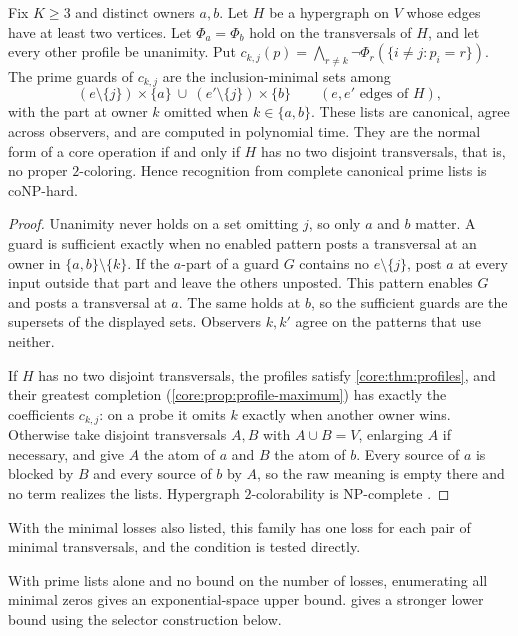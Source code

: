 \begin{proposition}
\label{core:prop:prime-profile-hardness}
Fix $K\ge3$ and distinct owners $a,b$. Let $H$ be a hypergraph on $V$
whose edges have at least two vertices. Let $\Phi_a=\Phi_b$ hold on the
transversals of $H$, and let every other profile be unanimity. Put
$c_{k,j}(p)=\bigwedge_{r\ne k}\neg\Phi_r(\{i\ne j:p_i=r\})$.
The prime guards of $c_{k,j}$ are the inclusion-minimal sets among
\[
 (e\setminus\{j\})\times\{a\}\ \cup\ (e'\setminus\{j\})\times\{b\}
 \qquad(e,e'\text{ edges of }H),
\]
with the part at owner $k$ omitted when $k\in\{a,b\}$. These lists are
canonical, agree across observers, and are computed in polynomial time.
They are the normal form of a core operation if and only if $H$ has no
two disjoint transversals, that is, no proper $2$-coloring. Hence
recognition from complete canonical prime lists is coNP-hard.
\end{proposition}
\begin{proof}
Unanimity never holds on a set omitting $j$, so only $a$ and $b$ matter.
A guard is sufficient exactly when no enabled pattern posts a transversal
at an owner in $\{a,b\}\setminus\{k\}$. If the $a$-part of a guard $G$
contains no $e\setminus\{j\}$, post $a$ at every input outside that part
and leave the others unposted. This pattern enables $G$ and posts a
transversal at $a$. The same holds at $b$, so the sufficient guards are
the supersets of the displayed sets. Observers $k,k'$ agree on the
patterns that use neither.

If $H$ has no two disjoint transversals, the profiles satisfy
\cref{core:thm:profiles}, and their greatest completion
(\cref{core:prop:profile-maximum}) has exactly the coefficients
$c_{k,j}$: on a probe it omits $k$ exactly when another owner wins.
Otherwise take disjoint transversals $A,B$ with $A\cup B=V$, enlarging
$A$ if necessary, and give $A$ the atom of $a$ and $B$ the atom of $b$.
Every source of $a$ is blocked by $B$ and every source of $b$ by $A$,
so the raw meaning is empty there and no term realizes the lists.
Hypergraph $2$-colorability is NP-complete
\cite[SP4]{GareyJohnson1979}.
\end{proof}

With the minimal losses also listed, this family has one loss for each
pair of minimal transversals, and the condition is tested directly.

With prime lists alone and no bound on the number of losses,
enumerating all minimal zeros gives an exponential-space upper bound.
 gives a stronger lower bound
using the selector construction below.

